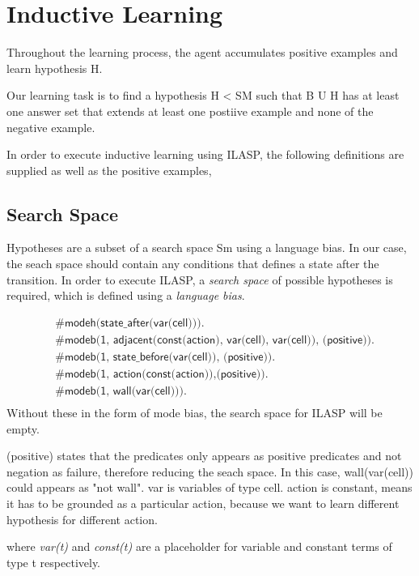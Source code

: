 \section{Inductive Learning}
\label{induction}
Throughout the learning process, the agent accumulates positive examples and learn hypothesis H.

Our learning task is to find a hypothesis H < SM such that B U H has at least one answer set that extends at least one postiive example and none of the negative example.

In order to execute inductive learning using ILASP, the following definitions are supplied as well as the positive examples,

\subsection{Search Space}

Hypotheses are a subset of a search space Sm using a language bias. In our case, the seach space should contain any conditions that defines a state after the transition.
In order to execute ILASP, a \textit{search space} of possible hypotheses is required, which is defined using a \textit{language bias}.

\begin{equation}
\begin{split}
&\textsf{\#modeh(state\_after(var(cell))).}\\
&\textsf{\#modeb(1, adjacent(const(action), var(cell), var(cell)), (positive)).} \\
&\textsf{\#modeb(1, state\_before(var(cell)), (positive)).} \\
&\textsf{\#modeb(1, action(const(action)),(positive)).} \\
&\textsf{\#modeb(1, wall(var(cell))).} \\
\end{split}
\end{equation}
Without these in the form of mode bias, the search space for ILASP will be empty.

(positive) states that the predicates only appears as positive predicates and not negation as failure, therefore reducing the seach space. In this case, wall(var(cell)) could appears as "not wall". 
var is variables of type cell. 
action is constant, means it has to be grounded as a particular action, because we want to learn different hypothesis for different action. 

where \textit{var(t)} and \textit{const(t)} are a placeholder for variable and constant terms of type t respectively.


